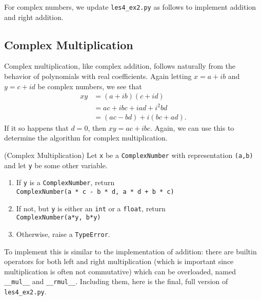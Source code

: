 \documentclass[m3380-lec-main.tex]{subfiles}
\begin{document}
For complex numbers, we update \verb|les4_ex2.py| as follows to implement addition and right addition.

\smallskip\noindent

\subsection{Complex Multiplication}
Complex multiplication, like complex addition, follows naturally from the behavior of polynomials with real coefficients. Again letting $x=a+ib$ and $y=c+id$ be complex numbers, we see that
\begin{align*}
xy &= (a+ib)(c+id) \\
	&= ac +ibc +iad + i^2bd \\
	&= (ac-bd)+i(bc+ad).
\end{align*}
If it so happens that $d=0$, then $xy = ac+ibc$. Again, we can use this to determine the algorithm for complex multiplication.

\begin{alg}(Complex Multiplication) Let \verb|x| be a \verb|ComplexNumber| with representation \verb|(a,b)| and let \verb|y| be some other variable.
\begin{enumerate}\setlength{\itemsep}{0pt}
\item If \verb|y| is a \verb|ComplexNumber|, return \\
	\verb|ComplexNumber(a * c - b * d, a * d + b * c)|
\item If not, but \verb|y| is either an \verb|int| or a \verb|float|, return\\
	\verb|ComplexNumber(a*y, b*y)|
\item Otherwise, raise a \verb|TypeError|.
\end{enumerate}
\end{alg}

To implement this is similar to the implementation of addition: there are builtin operators for both left and right multiplication (which is important since multiplication is often not commutative) which can be overloaded, named \verb|__mul__| and \verb|__rmul__|. Including them, here is the final, full version of \verb|les4_ex2.py|.
\end{document}
